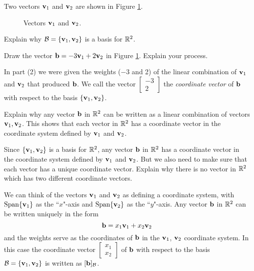 \begin{pa} \label{pa:3_e} Two vectors $\mathbf{v}_1$ and $\mathbf{v}_2$ are shown in Figure \ref{F:PA_5d_1}. 
\begin{figure}[h]
\begin{center}
\end{center}
\caption{Vectors $\mathbf{v}_1$ and $\mathbf{v}_2$.}
\label{F:PA_5d_1}
\end{figure}

\be
\item Explain why $\mathcal{B} = \{\mathbf{v}_1, \mathbf{v}_2\}$ is a basis for $\mathbb{R}^2$. 


\item Draw the vector $\mathbf{b} = -3\mathbf{v}_1 + 2\mathbf{v}_2$ in Figure \ref{F:PA_5d_1}. Explain your process. 

\item In part (2) we were given the weights ($-3$ and 2) of the linear combination of $\mathbf{v}_1$ and $\mathbf{v}_2$ that produced $\mathbf{b}$. We call the vector $\left[ \begin{array}{r} -3 \\2 \end{array} \right]$ the \emph{coordinate vector} of $\mathbf{b}$ with respect to the basis $\{\mathbf{v}_1, \mathbf{v}_2\}$.  

Explain why any vector $\mathbf{b}$ in $\mathbb{R}^2$ can be written as a linear combination of vectors $\mathbf{v}_1, \mathbf{v}_2$. This shows that each vector in $\mathbb{R}^2$ has a coordinate vector in the coordinate system defined by $\mathbf{v}_1$ and $\mathbf{v}_2$.


\item Since $\{\mathbf{v}_1, \mathbf{v}_2\}$ is a basis for $\mathbb{R}^2$, any vector $\mathbf{b}$ in $\mathbb{R}^2$ has a coordinate vector in the coordinate system defined by $\mathbf{v}_1$ and $\mathbf{v}_2$. But we also need to make sure that each vector has a unique coordinate vector. Explain why there is no vector in $\mathbb{R}^2$ which has two different coordinate vectors.

\item We can think of the vectors $\mathbf{v}_1$ and $\mathbf{v}_2$ as defining a coordinate system, with $\text{Span}\{\mathbf{v}_1\}$ as the ``$x$"-axis and $\text{Span}\{\mathbf{v}_2\}$ as the ``$y$"-axis. Any vector $\mathbf{b}$ in $\mathbb{R}^2$ can be written uniquely in the form
\[\mathbf{b} = x_1 \mathbf{v}_1 + x_2 \mathbf{v}_2\]
and the weights serve as the coordinates of $\mathbf{b}$ in the $\mathbf{v}_1$, $\mathbf{v}_2$ coordinate system. In this case the coordinate vector $\left[ \begin{array}{c} x_1 \\ x_2 \end{array} \right]$ of $\mathbf{b}$ with respect to the basis $\mathcal{B} =\nobreak \{\mathbf{v}_1, \mathbf{v}_2\}$ is written as $[\mathbf{b}]_{\mathcal{B}}$.


\end{pa}
